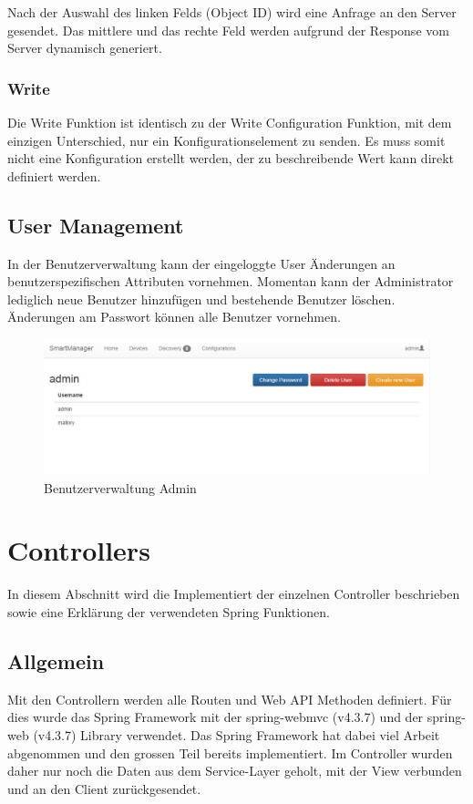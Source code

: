 Nach der Auswahl des linken Felds (Object ID) wird eine Anfrage an den Server gesendet. Das mittlere und das rechte Feld werden aufgrund der Response vom Server dynamisch generiert.

\subsubsection{Write}
Die Write Funktion ist identisch zu der Write Configuration Funktion, mit dem einzigen Unterschied, nur ein Konfigurationselement zu senden. Es muss somit nicht eine Konfiguration erstellt werden, der zu beschreibende Wert kann direkt definiert werden.
\newpage

\subsection{User Management}
In der Benutzerverwaltung kann der eingeloggte User Änderungen an benutzerspezifischen Attributen vornehmen. Momentan kann der Administrator lediglich neue Benutzer hinzufügen und bestehende Benutzer löschen. Änderungen am Passwort können alle Benutzer vornehmen. 

\begin{figure}[H]
\centering
\includegraphics[scale=0.6]{../04_Realisierung/images/userinterface/usermanagement.png}
\caption{Benutzerverwaltung Admin}
\end{figure}

\newpage

\section{Controllers}
In diesem Abschnitt wird die Implementiert der einzelnen Controller beschrieben sowie eine Erklärung der verwendeten Spring Funktionen.

\subsection{Allgemein}
Mit den Controllern werden alle Routen und Web API Methoden definiert. Für dies wurde das Spring Framework mit der spring-webmvc (v4.3.7) und der spring-web (v4.3.7) Library verwendet. Das Spring Framework hat dabei viel Arbeit abgenommen und den grossen Teil bereits implementiert. Im Controller wurden daher nur noch die Daten aus dem Service-Layer geholt, mit der View verbunden und an den Client zurückgesendet.

